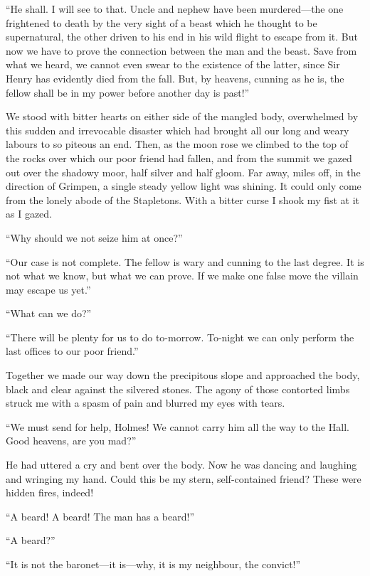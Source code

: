 \documentclass[paper=a5,BCOR=7mm,twoside,DIV=calc,12pt,usegeometry,openany,chapterprefix,endperiod,headings=big]{scrbook} %
\begin{document}
\enquote{He shall. I will see to that. Uncle and nephew have been murdered---the one frightened to death by the very sight of a beast which he thought to be supernatural, the other driven to his end in his wild flight to escape from it. But now we have to prove the connection between the man and the beast. Save from what we heard, we cannot even swear to the existence of the latter, since Sir Henry has evidently died from the fall. But, by heavens, cunning as he is, the fellow shall be in my power before another day is past!}

We stood with bitter hearts on either side of the mangled body, overwhelmed by this sudden and irrevocable disaster which had brought all our long and weary labours to so piteous an end. Then, as the moon rose we climbed to the top of the rocks over which our poor friend had fallen, and from the summit we gazed out over the shadowy moor, half silver and half gloom. Far away, miles off, in the direction of Grimpen, a single steady yellow light was shining. It could only come from the lonely abode of the Stapletons. With a bitter curse I shook my fist at it as I gazed.

\enquote{Why should we not seize him at once?}

\enquote{Our case is not complete. The fellow is wary and cunning to the last degree. It is not what we know, but what we can prove. If we make one false move the villain may escape us yet.}

\enquote{What can we do?}

\enquote{There will be plenty for us to do to-morrow. To-night we can only perform the last offices to our poor friend.}

Together we made our way down the precipitous slope and approached the body, black and clear against the silvered stones. The agony of those contorted limbs struck me with a spasm of pain and blurred my eyes with tears.

\enquote{We must send for help, Holmes! We cannot carry him all the way to the Hall. Good heavens, are you mad?}

He had uttered a cry and bent over the body. Now he was dancing and laughing and wringing my hand. Could this be my stern, self-contained friend? These were hidden fires, indeed!

\enquote{A beard! A beard! The man has a beard!}

\enquote{A beard?}

\enquote{It is not the baronet---it is---why, it is my neighbour, the convict!}
\end{document}
